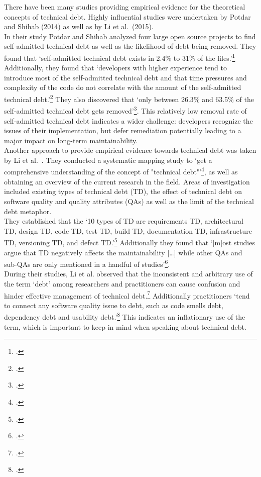 There have been many studies providing empirical evidence for the theoretical concepts of technical debt. Highly influential studies were undertaken by Potdar and Shihab (2014) as well as by Li et al.\ (2015).\\
In their study Potdar and Shihab analyzed four large open source projects to find self-admitted technical debt as well as the likelihood of debt being removed. They found that `self-admitted technical debt exists in 2.4\% to 31\% of the files.'\footcite[1]{potdarExploratoryStudySelfAdmitted2014}
Additionally, they found that `developers with higher experience tend to introduce most of the self-admitted technical debt and that time pressures and complexity of the code do not correlate with the amount of the self-admitted technical debt.'\footcite[1]{potdarExploratoryStudySelfAdmitted2014}
They also discovered that `only between 26.3\% and 63.5\% of the self-admitted technical debt gets removed'\footcite[1]{potdarExploratoryStudySelfAdmitted2014}. This relatively low removal rate of self-admitted technical debt indicates a wider challenge:
developers recognize the issues of their implementation, but defer remediation potentially leading to a major impact on long-term maintainability.\\
Another approach to provide empirical evidence towards technical debt was taken by Li et al.\ . They conducted a systematic mapping study to `get a comprehensive understanding of the concept of "technical debt"'\footcite[194]{liSystematicMappingStudy2015}, as well as obtaining an overview of the current research in the field.
Areas of investigation included existing types of technical debt (TD), the effect of technical debt on software quality and quality attributes (QAs) as well as the limit of the technical debt metaphor.\\
They established that the `10 types of TD are requirements TD, architectural TD, design TD, code TD, test TD, build TD, documentation TD, infrastructure TD, versioning TD, and defect TD.'\footcite[215]{liSystematicMappingStudy2015}
Additionally they found that `[m]ost studies argue that TD negatively affects the maintainability [\ldots] while other QAs and sub-QAs are only mentioned in a handful of studies'\footcite[215]{liSystematicMappingStudy2015}.\\
During their studies,  Li et al. observed that the inconsistent and arbitrary use of the term `debt' among researchers and practitioners can cause confusion and hinder effective management of technical debt.\footcite[211]{liSystematicMappingStudy2015} Additionally practitioners `tend to connect any software quality issue to debt, such as code smells debt, dependency debt and usability debt.'\footcite[212]{liSystematicMappingStudy2015}
This indicates an inflationary use of the term, which is important to keep in mind when speaking about technical debt.\\

